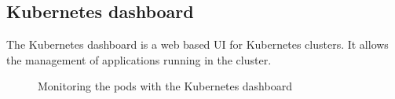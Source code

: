 \begin{appendices}
    \section{Kubernetes dashboard}
    The Kubernetes dashboard is a web based UI for Kubernetes clusters.
    It allows the management of applications running in the cluster.
    \begin{figure}[H]
        \centering
        \caption*{Monitoring the pods with the Kubernetes dashboard}
    \end{figure}
    \newpage
\end{appendices}

